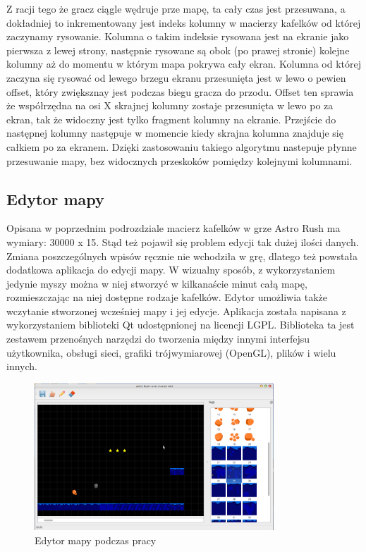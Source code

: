 Z racji tego że gracz ciągle wędruje prze mapę, ta cały czas jest przesuwana, a dokładniej  to inkrementowany jest indeks kolumny w macierzy kafelków od której zaczynamy rysowanie. Kolumna o takim indeksie rysowana jest na ekranie jako pierwsza z lewej strony, następnie rysowane są obok (po prawej stronie) kolejne kolumny aż do momentu w którym mapa pokrywa cały ekran.
Kolumna od której zaczyna się rysować od lewego brzegu ekranu przesunięta jest w lewo o pewien offset, który zwiększnay jest podczas biegu gracza do przodu. Offset ten sprawia że współrzędna na osi X skrajnej kolumny zostaje przesunięta w lewo po za ekran, tak że widoczny jest tylko fragment kolumny na ekranie. Przejście do następnej kolumny następuje w momencie kiedy skrajna kolumna znajduje się całkiem po za ekranem. Dzięki zastosowaniu takiego algorytmu nastepuje płynne przesuwanie mapy, bez widocznych przeskoków pomiędzy kolejnymi kolumnami.
 

\subsection{Edytor mapy}
Opisana w poprzednim podrozdziale macierz kafelków w grze Astro Rush ma wymiary: 30000 x 15. Stąd też pojawił się problem edycji tak dużej ilości danych. Zmiana poszczególnych wpisów ręcznie nie wchodziła w grę, dlatego też powstała dodatkowa aplikacja do edycji mapy. W wizualny sposób, z wykorzystaniem jedynie myszy można w niej stworzyć w kilkanaście minut całą mapę, rozmieszczając na niej dostępne rodzaje kafelków. Edytor umożliwia także wczytanie stworzonej wcześniej mapy i jej edycje. Aplikacja została napisana z wykorzystaniem biblioteki Qt udostępnionej na licencji LGPL. Biblioteka ta jest zestawem przenośnych narzędzi do tworzenia między innymi interfejsu użytkownika, obsługi sieci, grafiki trójwymiarowej (OpenGL), plików i wielu innych. 


\begin{figure}[h]
    \centering
    \includegraphics[width=0.8\textwidth,natwidth=800,natheight=160]{./Pictures/designer.png}
    \caption{Edytor mapy podczas pracy}
\end{figure}

